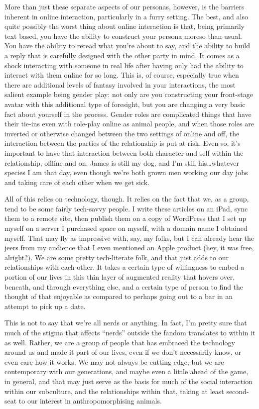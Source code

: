 More than just these separate aspects of our personas, however, is the barriers inherent in online interaction, particularly in a furry setting. The best, and also quite possibly the worst thing about online interaction is that, being primarily text based, you have the ability to construct your persona moreso than usual. You have the ability to reread what you're about to say, and the ability to build a reply that is carefully designed with the other party in mind. It comes as a shock interacting with someone in real life after having only had the ability to interact with them online for so long. This is, of course, especially true when there are additional levels of fantasy involved in your interactions, the most salient example being gender play: not only are you constructing your front-stage avatar with this additional type of foresight, but you are changing a very basic fact about yourself in the process. Gender roles are complicated things that have their tie-ins even with role-play online as animal people, and when those roles are inverted or otherwise changed between the two settings of online and off, the interaction between the parties of the relationship is put at risk.  Even so, it's important to have that interaction between both character and self within the relationship, offline and on. James is still my dog, and I'm still his…whatever species I am that day, even though we're both grown men working our day jobs and taking care of each other when we get sick.

All of this relies on technology, though. It relies on the fact that we, as a group, tend to be some fairly tech-savvy people. I write these articles on an iPad, sync them to a remote site, then publish them on a copy of WordPress that I set up myself on a server I purchased space on myself, with a domain name I obtained myself. That may fly as impressive with, say, my folks, but I can already hear the jeers from my audience that I even mentioned an Apple product (hey, it was free, alright?). We are some pretty tech-literate folk, and that just adds to our relationships with each other. It takes a certain type of willingness to embed a portion of our lives in this thin layer of augmented reality that hovers over, beneath, and through everything else, and a certain type of person to find the thought of that enjoyable as compared to perhaps going out to a bar in an attempt to pick up a date.

This is not to say that we're all nerds or anything. In fact, I'm pretty sure that much of the stigma that affects “nerds” outside the fandom translates to within it as well. Rather, we are a group of people that has embraced the technology around us and made it part of our lives, even if we don't necessarily know, or even care how it works. We may not always be cutting edge, but we are contemporary with our generations, and maybe even a little ahead of the game, in general, and that may just serve as the basis for much of the social interaction within our subculture, and the relationships within that, taking at least second-seat to our interest in anthropomorphising animals.

